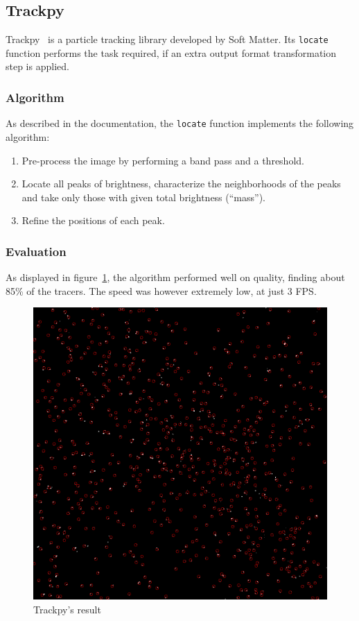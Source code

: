 \subsection{Trackpy}

Trackpy~\cite{trackpy} is a particle tracking library developed by Soft Matter.
Its \texttt{locate} function performs the task required, if an extra output format transformation step is applied.

\subsubsection{Algorithm}

As described in the documentation, the \texttt{locate} function implements the following algorithm:
\begin{enumerate}
	\itemsep 0em
	\item Pre-process the image by performing a band pass and a threshold.
	\item Locate all peaks of brightness, characterize the neighborhoods of the peaks and take only those with given total brightness (``mass'').
	\item Refine the positions of each peak.
\end{enumerate}

\subsubsection{Evaluation}

As displayed in figure~\ref{fig:locate:trackpy}, the algorithm performed well on quality, finding about 85\% of the tracers.
The speed was however extremely low, at just 3 FPS.

\begin{figure}
	\centerline{\includegraphics[width=\locateimgsize]{images/locate/trackpy.png}}
	\caption{\centering Trackpy's result}
	\label{fig:locate:trackpy}
\end{figure}
